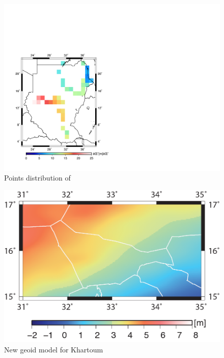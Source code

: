       \begin{figure}[t]
      	\caption{Points distribution of \cite{osman}}
      	\label{figure:point_astro_dist}
      	\includegraphics{Figures/points_astro_dist.pdf}
      	\centering
      \end{figure}
      
    \begin{figure}[t]
          	\caption{New geoid model for Khartoum \cite{ahmed_msc}}
          	\label{figure:point_gps_dist}
          	\includegraphics{Figures/krt.png}
          	\centering
    \end{figure}
    
